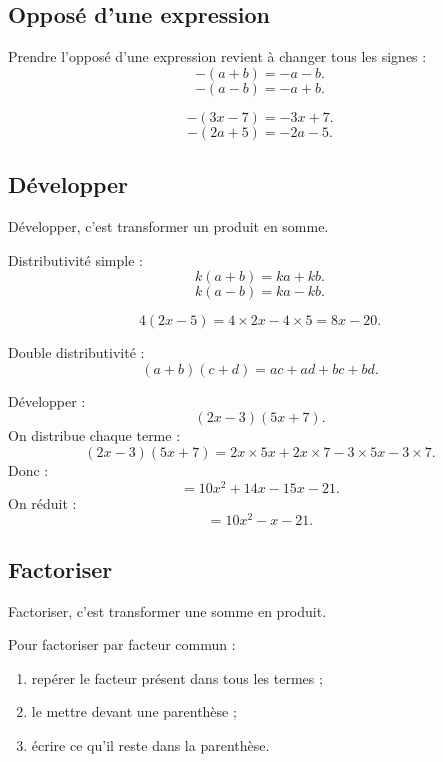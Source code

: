 \documentclass[11pt,a4paper]{article}
\begin{document}
\subsection{Opposé d'une expression}

\begin{propriete}
Prendre l'opposé d'une expression revient à changer tous les signes :
\[
-(a+b)=-a-b.
\]
\[
-(a-b)=-a+b.
\]
\end{propriete}

\begin{exemple}
\[
-(3x-7)=-3x+7.
\]
\[
-(2a+5)=-2a-5.
\]
\end{exemple}

\subsection{Développer}

\begin{definitionbox}
Développer, c'est transformer un produit en somme.
\end{definitionbox}

\begin{propriete}
Distributivité simple :
\[
k(a+b)=ka+kb.
\]
\[
k(a-b)=ka-kb.
\]
\end{propriete}

\begin{exemple}
\[
4(2x-5)=4\times2x-4\times5=8x-20.
\]
\end{exemple}

\begin{propriete}
Double distributivité :
\[
(a+b)(c+d)=ac+ad+bc+bd.
\]
\end{propriete}

\begin{exemple}
Développer :
\[
(2x-3)(5x+7).
\]
On distribue chaque terme :
\[
(2x-3)(5x+7)
=
2x\times5x+2x\times7-3\times5x-3\times7.
\]
Donc :
\[
=10x^2+14x-15x-21.
\]
On réduit :
\[
=10x^2-x-21.
\]
\end{exemple}

\subsection{Factoriser}

\begin{definitionbox}
Factoriser, c'est transformer une somme en produit.
\end{definitionbox}

\begin{methode}
Pour factoriser par facteur commun :
\begin{enumerate}
  \item repérer le facteur présent dans tous les termes ;
  \item le mettre devant une parenthèse ;
  \item écrire ce qu'il reste dans la parenthèse.
\end{enumerate}
\end{methode}
\end{document}
